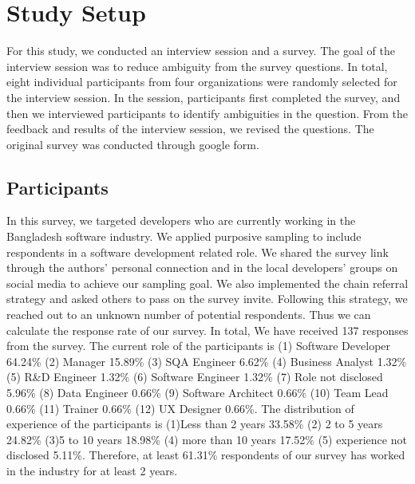 \section{Study Setup}
\label{study_setup}

For this study, we conducted an interview session and a survey. The goal of the interview session was to reduce ambiguity from the survey questions. In total, eight individual participants from four organizations were randomly selected for the interview session. In the session, participants first completed the survey, and then we interviewed participants to identify ambiguities in the question. From the feedback and results of the interview session, we revised the questions. The original survey was conducted through google form.

\subsection{Participants}
\label{survey_participants}
In this survey, we targeted developers who are currently working in the Bangladesh software industry. We applied purposive sampling\cite{Vogt2005} to include respondents in a software development related role. We shared the survey link through the authors' personal connection and in the local developers' groups on social media to achieve our sampling goal. We also implemented the chain referral strategy\cite{creswell2013} and asked others to pass on the survey invite. Following this strategy, we reached out to an unknown number of potential respondents. Thus we can calculate the response rate of our survey. In total, We have received 137 responses from the survey. The current role of the participants is (1) Software Developer 64.24\% (2) Manager 15.89\% (3) SQA Engineer 6.62\% (4) Business Analyst 1.32\% (5) R\&D Engineer 1.32\% (6) Software Engineer 1.32\% (7) Role not disclosed 5.96\% (8) Data Engineer 0.66\% (9) Software Architect 0.66\% (10) Team Lead 0.66\% (11) Trainer 0.66\% (12) UX Designer 0.66\%. The distribution of experience of the participants is (1)Less than 2 years 33.58\% (2) 2 to 5 years 24.82\% (3)5 to 10 years 18.98\% (4) more than 10 years 17.52\% (5) experience not disclosed 5.11\%. Therefore, at least 61.31\% respondents of our survey has worked in the industry for at least 2 years.



